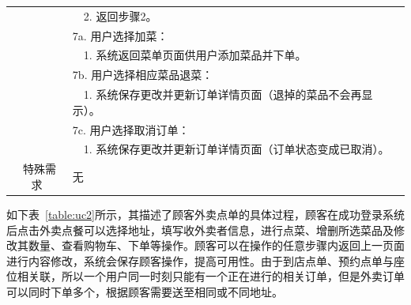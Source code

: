 \begin{table}[htbp!]
\begin{tabular}{cp{11.5cm}}
    & ~~2.	返回步骤2。\\
    & 7a. 用户选择加菜：\\
    & ~~1.	系统返回菜单页面供用户添加菜品并下单。\\
    & 7b. 用户选择相应菜品退菜：\\
    & ~~1.	系统保存更改并更新订单详情页面（退掉的菜品不会再显示）。\\
    & 7c. 用户选择取消订单：\\
    & ~~1.  系统保存更改并更新订单详情页面（订单状态变成已取消）。\\
  \hline
  \ 特殊需求 & 无 \\ 
  \hline
  \end{tabular}
  \label{table:uc1}
\end{table}

如下表~\ref{table:uc2}所示，其描述了顾客外卖点单的具体过程，顾客在成功登录系统后点击外卖点餐可以选择地址，填写收外卖者信息，进行点菜、增删所选菜品及修改其数量、查看购物车、下单等操作。顾客可以在操作的任意步骤内返回上一页面进行内容修改，系统会保存顾客操作，提高可用性。由于到店点单、预约点单与座位相关联，所以一个用户同一时刻只能有一个正在进行的相关订单，但是外卖订单可以同时下单多个，根据顾客需要送至相同或不同地址。

